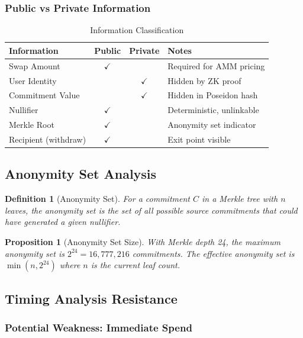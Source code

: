 \documentclass[11pt,a4paper]{article}
\newtheorem{proposition}[theorem]{Proposition}
\newtheorem{definition}[theorem]{Definition}
\begin{document}
\subsubsection{Public vs Private Information}

\begin{table}[H]
\centering
\begin{tabular}{|l|c|c|l|}
\hline
\textbf{Information} & \textbf{Public} & \textbf{Private} & \textbf{Notes} \\
\hline
Swap Amount & $\checkmark$ & & Required for AMM pricing \\
User Identity & & $\checkmark$ & Hidden by ZK proof \\
Commitment Value & & $\checkmark$ & Hidden in Poseidon hash \\
Nullifier & $\checkmark$ & & Deterministic, unlinkable \\
Merkle Root & $\checkmark$ & & Anonymity set indicator \\
Recipient (withdraw) & $\checkmark$ & & Exit point visible \\
\hline
\end{tabular}
\caption{Information Classification}
\end{table}

\subsection{Anonymity Set Analysis}

\begin{definition}[Anonymity Set]
For a commitment $C$ in a Merkle tree with $n$ leaves, the anonymity set is the set of all possible source commitments that could have generated a given nullifier.
\end{definition}

\begin{proposition}[Anonymity Set Size]
With Merkle depth 24, the maximum anonymity set is $2^{24} = 16,777,216$ commitments. The effective anonymity set is $\min(n, 2^{24})$ where $n$ is the current leaf count.
\end{proposition}

\subsection{Timing Analysis Resistance}

\subsubsection{Potential Weakness: Immediate Spend}
\end{document}
